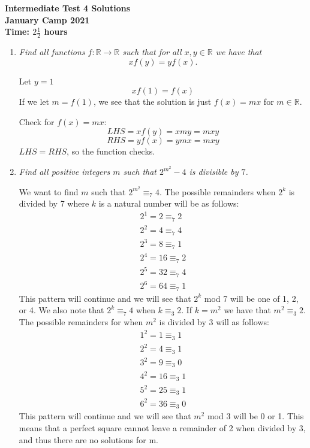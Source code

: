 \documentclass{article}
\begin{document}
\thispagestyle{empty}

\begin{center}
  \textbf{\Large Intermediate Test 4 Solutions}
  \\ \vspace{1em}
  \textbf{\large January Camp 2021}
  \\ \vspace{1em}
  \textbf{\large Time: $2\frac{1}{2}$ hours}
\end{center}

\vspace{24pt}

\begin{enumerate}[1.]

\item %
{\itshape Find all functions $f : \mathbb{R} \to \mathbb{R}$ such that for all $x, y \in \mathbb{R}$ we have that
\[ xf(y) = yf(x). \]}

Let $y = 1$ $$xf(1) = f(x)$$ If we let $m = f(1)$, we see that the solution is just $f(x) = mx$ for $m \in \mathbb{R}$.

Check for $f(x) = mx$:$$LHS = xf(y) = xmy = mxy$$ $$RHS = yf(x) = ymx = mxy$$ $LHS = RHS$, so the function checks.

\item %
{\itshape Find all positive integers $m$ such that $2^{m^2}-4$ is divisible by $7$.}

We want to find $m$ such that $2^{m^2}\equiv _{7} 4$. 
The possible remainders when $2^k$ is divided by 7 where $k$ is a natural number will be as follows:
\begin{align*} 
2^1 = 2 \equiv _{7} 2\\
2^2 = 4 \equiv _{7} 4\\
2^3 = 8 \equiv _{7} 1\\
2^4 = 16 \equiv _{7} 2\\
2^5 = 32 \equiv _{7} 4\\
2^6 = 64 \equiv _{7} 1
\end{align*}
This pattern will continue and we will see that $2^k$ mod 7 will be one of 1, 2, or 4. 
We also note that $2^k \equiv _{7} 4$ when $k \equiv _{3} 2$. 
If $k = m^2$ we have that $m^2 \equiv _{3} 2$. The possible remainders for when $m^2$ is divided by 3 will as follows:
\begin{align*}
1^2 = 1 \equiv _{3}  1 \\
2^2 = 4 \equiv _{3}  1 \\
3^2 = 9 \equiv _{3}  0 \\ 
4^2 = 16 \equiv _{3}  1 \\
5^2 = 25 \equiv _{3}  1 \\ 
6^2 = 36 \equiv _{3}  0
\end{align*}
This pattern will continue and we will see that $m^2$ mod 3 will be 0 or 1.
This means that a perfect square cannot leave a remainder of 2 when divided by 3, and thus there are no solutions for m.


\end{enumerate}
\end{document}
